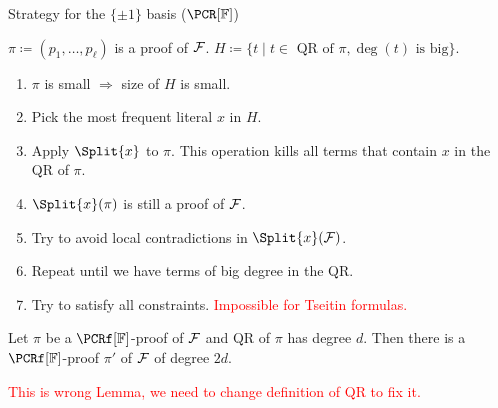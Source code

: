 \begin{frame}{Strategy for the $\{\pm 1\}$ basis ($\PCR[\field]$)}
    
    $\pi \coloneqq (p_1, \dots, p_{\ell})$ is a proof of $\mathcal{F}$. $H \coloneqq \{t \mid t \in \text{ QR of }
    \pi, \deg(t) \text{ is big}\}$.

    \begin{enumerate}
        \item $\pi$ is small $\Rightarrow$ size of $H$ is small.
        \pause
        \item Pick the most frequent literal $x$ in $H$.
        \pause
        \item Apply $\Split{x}$ to $\pi$. This operation kills all terms that contain $x$ in the QR of $\pi$.
        \pause
        \item $\Split{x}(\pi)$ is still a proof of  $\mathcal{F}$.
        \pause
        \item Try to avoid local contradictions in $\Split{x}(\Fs)$. 
        \pause
        \item Repeat until we have terms of big degree in the QR.
        \vspace{0.3cm}
        \pause
        \item Try to satisfy all  constraints. \pause \textcolor{red}{Impossible for
            Tseitin formulas.}
    \end{enumerate}

    \pause
    \begin{lemma}
        Let $\pi$ be a $\PCRf[\field]$-proof of $\mathcal{F}$ and QR of $\pi$ has degree $d$. Then there is a
        $\PCRf[\field]$-proof $\pi'$ of $\mathcal{F}$ of degree $2d$.
    \end{lemma}
    \pause
    \textcolor{red}{This is wrong Lemma, we need to change definition of QR to fix it.}
\end{frame}

